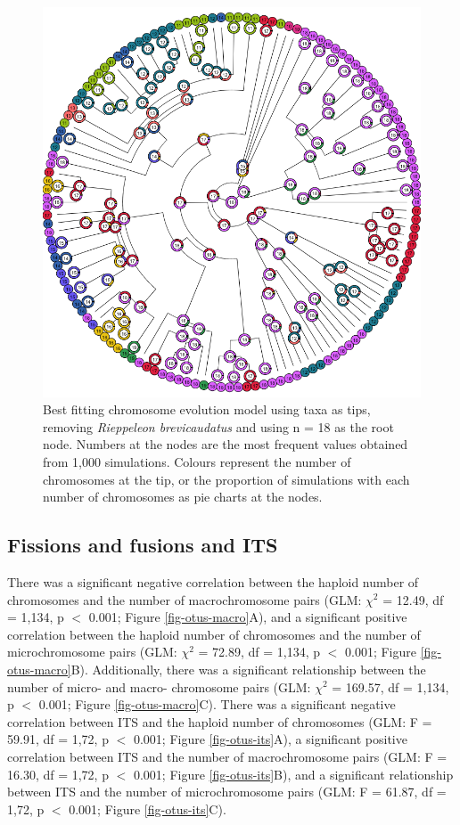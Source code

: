\documentclass[a4paper, 12pt]{article}
\begin{document}
\begin{figure}[H]
 \centering
  \includegraphics[width = \linewidth]{figures/tree-best-model-taxa.png}
  \caption{Best fitting chromosome evolution model using taxa as tips, removing \textit{Rieppeleon brevicaudatus} and using n = 18 as the root node. Numbers at the nodes are the most frequent values obtained from 1,000 simulations. Colours represent the number of chromosomes at the tip, or the proportion of simulations with each number of chromosomes as pie charts at the nodes.
}
  \label{fig-otus-models}
\end{figure} 

\subsection{Fissions and fusions and ITS}
There was a significant negative correlation between the haploid number of chromosomes and the number of macrochromosome pairs (GLM: $\chi^2$ = 12.49, df = 1,134, p $<$ 0.001; Figure \ref{fig-otus-macro}A), and a significant positive correlation between the haploid number of chromosomes and the number of microchromosome pairs (GLM: $\chi^2$ = 72.89, df = 1,134, p $<$ 0.001; Figure \ref{fig-otus-macro}B). Additionally, there was a significant relationship between the number of micro- and macro- chromosome pairs (GLM: $\chi^2$ = 169.57, df = 1,134, p $<$ 0.001; Figure \ref{fig-otus-macro}C). There was a significant negative correlation between ITS and the haploid number of chromosomes (GLM: F = 59.91, df = 1,72, p $<$ 0.001; Figure \ref{fig-otus-its}A), a significant positive correlation between ITS and the number of macrochromosome pairs (GLM: F = 16.30, df = 1,72, p $<$ 0.001; Figure \ref{fig-otus-its}B), and a significant relationship between ITS and the number of microchromosome pairs (GLM: F = 61.87, df = 1,72, p $<$ 0.001; Figure \ref{fig-otus-its}C). 
\end{document}
